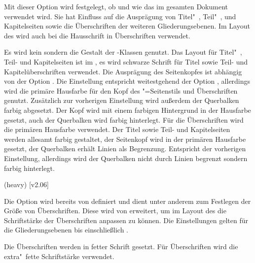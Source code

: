 \begin{DeclareEntity*}{}
\begin{DeclareEntity*}{}
\begin{DeclareEntity*}{}
\begin{Declaration}
Mit dieser Option wird festgelegt, ob und wie das \TUDCD im gesamten Dokument 
verwendet wird. Sie hat Einfluss auf die Ausprägung von Titel"~, Teil"~, und 
Kapitelseiten sowie die Überschriften der weiteren Gliederungsebenen. 
Im Layout des \CDs wird auch bei  die Hausschrift in 
Überschriften verwendet.
\begin{DeclareValues}
  Es wird kein \CD sondern die Gestalt der \KOMAScript-Klassen genutzt.
  Das Layout für Titel"~, Teil- und Kapitelseiten ist im \CD, es wird 
  schwarze Schrift für Titel sowie Teil- und Kapitelüberschriften verwendet.
  Die Ausprägung des Seitenkopfes ist abhängig von der Option .
  Die Einstellung entspricht weitestgehend der Option , 
  allerdings wird die primäre Hausfarbe  für den Kopf des 
  "=Seitenstils und Überschriften genutzt.
  Zusätzlich zur vorherigen Einstellung wird außerdem der Querbalken farbig 
  abgesetzt.
  Der Kopf wird mit einem farbigen Hintergrund in der Hausfarbe gesetzt, auch 
  der Querbalken wird farbig hinterlegt. Für die Überschriften wird die 
  primären Hausfarbe verwendet.
  Der Titel sowie Teil- und Kapitelseiten werden allesamt farbig gestaltet, 
  der Seitenkopf wird in der primären Hausfarbe  gesetzt, der 
  Querbalken erhält Linien als Begrenzung.
  Entspricht der vorherigen Einstellung, allerdings wird der Querbalken nicht 
  durch Linien begrenzt sondern farbig hinterlegt.
\end{DeclareValues}
\end{Declaration}
%

\begin{Declaration}
  {}
  (heavy)
  [v2.06]
\printdeclarationlist[Schriftstärke]

Die Option  wird bereits von \KOMAScript{} definiert 
und dient unter anderem zum Festlegen der Größe von Überschriften. Diese wird 
von \TUDScript erweitert, um im Layout des \CDs die Schriftstärke der 
Überschriften anpassen zu können. Die Einstellungen gelten für die 
Gliederungsebenen bis einschließlich .
\begin{DeclareValues}
  Die Überschriften werden in fetter Schrift gesetzt.
  Für Überschriften wird die extra"~fette Schriftstärke verwendet.
\end{DeclareValues}
\end{Declaration}




\end{DeclareEntity*}
\end{DeclareEntity*}
\end{DeclareEntity*}
